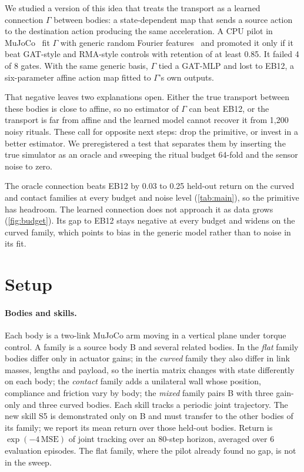 \documentclass[11pt]{article}
\begin{document}
We studied a version of this idea that treats the transport as a learned connection \(\Gamma\) between bodies: a state-dependent map that sends a source action to the destination action producing the same acceleration. A CPU pilot in MuJoCo~\citep{todorov2012mujoco} fit \(\Gamma\) with generic random Fourier features~\citep{rahimi2007random} and promoted it only if it beat GAT-style and RMA-style controls with retention of at least 0.85. It failed 4 of 8 gates. With the same generic basis, \(\Gamma\) tied a GAT-MLP and lost to EB12, a six-parameter affine action map fitted to \(\Gamma\)'s own outputs.

That negative leaves two explanations open. Either the true transport between these bodies is close to affine, so no estimator of \(\Gamma\) can beat EB12, or the transport is far from affine and the learned model cannot recover it from 1{,}200 noisy rituals. These call for opposite next steps: drop the primitive, or invest in a better estimator. We preregistered a test that separates them by inserting the true simulator as an oracle and sweeping the ritual budget 64-fold and the sensor noise to zero.

The oracle connection beats EB12 by 0.03 to 0.25 held-out return on the curved and contact families at every budget and noise level (\cref{tab:main}), so the primitive has headroom. The learned connection does not approach it as data grows (\cref{fig:budget}). Its gap to EB12 stays negative at every budget and widens on the curved family, which points to bias in the generic model rather than to noise in its fit.

\section{Setup}
\label{sec:setup}
\paragraph{Bodies and skills.}
Each body is a two-link MuJoCo arm moving in a vertical plane under torque control. A family is a source body B and several related bodies. In the \emph{flat} family bodies differ only in actuator gains; in the \emph{curved} family they also differ in link masses, lengths and payload, so the inertia matrix changes with state differently on each body; the \emph{contact} family adds a unilateral wall whose position, compliance and friction vary by body; the \emph{mixed} family pairs B with three gain-only and three curved bodies. Each skill tracks a periodic joint trajectory. The new skill S5 is demonstrated only on B and must transfer to the other bodies of its family; we report its mean return over those held-out bodies. Return is \(\exp(-4\,\mathrm{MSE})\) of joint tracking over an 80-step horizon, averaged over 6 evaluation episodes. The flat family, where the pilot already found no gap, is not in the sweep.
\end{document}
